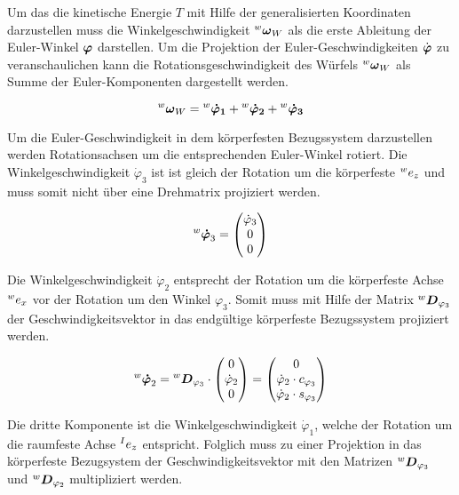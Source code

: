 Um das die kinetische Energie $T$ mit Hilfe der generalisierten Koordinaten darzustellen muss die Winkelgeschwindigkeit $\prescript{w}{}{}\boldsymbol{\omega}_W$ als die erste Ableitung der Euler-Winkel $\boldsymbol{\varphi}$ darstellen.
Um die Projektion der Euler-Geschwindigkeiten $\dot{\boldsymbol{\varphi}}$ zu veranschaulichen kann die Rotationsgeschwindigkeit des Würfels $\prescript{w}{}{}\boldsymbol{\omega}_W$ als Summe der Euler-Komponenten dargestellt werden.

\begin{equation}
\prescript{w}{}{}\boldsymbol{\omega}_W = \prescript{w}{}{}\boldsymbol{\dot{\varphi}_1} + \prescript{w}{}{}\boldsymbol{\dot{\varphi}_2} + \prescript{w}{}{}\boldsymbol{\dot{\varphi}_3}
\end{equation}

Um die Euler-Geschwindigkeit in dem körperfesten Bezugssystem darzustellen werden Rotationsachsen um die entsprechenden Euler-Winkel rotiert. Die Winkelgeschwindigkeit $\dot{\varphi}_3$ ist ist gleich der Rotation um die körperfeste $\prescript{w}{} e_z$ und muss somit nicht über eine Drehmatrix projiziert werden. 

\begin{equation}
\prescript{w}{}{}\boldsymbol{\dot{\varphi}}_3 =
\begin{pmatrix}
\dot{\varphi}_3 \\ 0 \\ 0
\end{pmatrix} 
\end{equation}

Die Winkelgeschwindigkeit $\dot{\varphi}_2$ entsprecht der Rotation um die körperfeste Achse $\prescript{w}{} e_x$ vor der Rotation um den Winkel $\varphi_3$. Somit muss mit Hilfe der  Matrix $\prescript{w}{}{}\boldsymbol{D}_{\varphi_3}$ der Geschwindigkeitsvektor in das endgültige körperfeste Bezugssystem projiziert werden.

\begin{equation}
\prescript{w}{}{}\boldsymbol{\dot{\varphi}}_2 = \prescript{w}{}{}\boldsymbol{D}_{\varphi_3} \cdot
\begin{pmatrix}
0 \\ \dot{\varphi}_2 \\ 0
\end{pmatrix} = 
\begin{pmatrix}
0 \\
\dot{\varphi}_2 \cdot c_{\varphi_3} \\
\dot{\varphi}_2 \cdot s_{\varphi_3}
\end{pmatrix}
\end{equation}

Die dritte Komponente ist die Winkelgeschwindigkeit $\dot{\varphi}_1$, welche der Rotation um die raumfeste Achse $\prescript{I}{} e_z$ entspricht. Folglich muss zu einer Projektion in das körperfeste Bezugsystem der Geschwindigkeitsvektor mit den Matrizen $\prescript{w}{}{}\boldsymbol{D}_{\varphi_3}$ und $\prescript{w}{}{}\boldsymbol{D}_{\varphi_2}$ multipliziert werden. 

